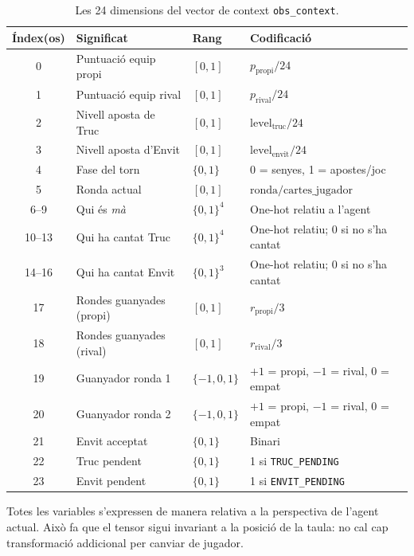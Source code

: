 \begin{table}[H]
  \centering
  \begin{tabular}{clll}
    \toprule
    Índex(os) & Significat & Rang & Codificació \\
    \midrule
    0   & Puntuació equip propi    & $[0,1]$ & $p_{\text{propi}} / 24$ \\
    1   & Puntuació equip rival    & $[0,1]$ & $p_{\text{rival}} / 24$ \\
    2   & Nivell aposta de Truc    & $[0,1]$ & $\text{level}_{\text{truc}} / 24$ \\
    3   & Nivell aposta d'Envit    & $[0,1]$ & $\text{level}_{\text{envit}} / 24$ \\
    4   & Fase del torn            & $\{0,1\}$ & 0 = senyes, 1 = apostes/joc \\
    5   & Ronda actual             & $[0,1]$ & $\text{ronda} / \text{cartes\_jugador}$ \\
    6–9 & Qui és \emph{mà}         & $\{0,1\}^4$ & One-hot relatiu a l'agent \\
    10–13 & Qui ha cantat Truc     & $\{0,1\}^4$ & One-hot relatiu; 0 si no s'ha cantat \\
    14–16 & Qui ha cantat Envit    & $\{0,1\}^3$ & One-hot relatiu; 0 si no s'ha cantat \\
    17  & Rondes guanyades (propi) & $[0,1]$ & $r_{\text{propi}} / 3$ \\
    18  & Rondes guanyades (rival) & $[0,1]$ & $r_{\text{rival}} / 3$ \\
    19  & Guanyador ronda 1        & $\{-1,0,1\}$ & $+1$ = propi, $-1$ = rival, $0$ = empat \\
    20  & Guanyador ronda 2        & $\{-1,0,1\}$ & $+1$ = propi, $-1$ = rival, $0$ = empat \\
    21  & Envit acceptat           & $\{0,1\}$ & Binari \\
    22  & Truc pendent             & $\{0,1\}$ & 1 si \texttt{TRUC\_PENDING} \\
    23  & Envit pendent            & $\{0,1\}$ & 1 si \texttt{ENVIT\_PENDING} \\
    \bottomrule
  \end{tabular}
  \caption{Les 24 dimensions del vector de context \texttt{obs\_context}.}
  \label{tab:context-obs}
\end{table}

Totes les variables s'expressen de manera relativa a la perspectiva de l'agent
actual. Això fa que el tensor sigui invariant a la posició de la taula: no cal
cap transformació addicional per canviar de jugador.


